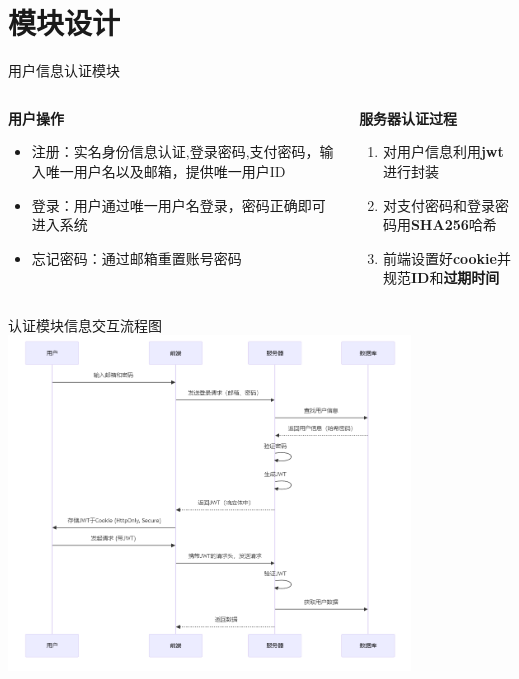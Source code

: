 \documentclass[]{beamer}
\begin{document}
    \section{模块设计}
    \begin{frame}{用户信息认证模块}
        \begin{columns}
            \begin{column}{0.5\textwidth}
                \textbf{用户操作}
                \begin{itemize}
                    \item 注册：实名身份信息认证,登录密码,支付密码，输入唯一用户名以及邮箱，提供唯一用户ID
                    \item 登录：用户通过唯一用户名登录，密码正确即可进入系统
                    \item 忘记密码：通过邮箱重置账号密码
                \end{itemize}
            \end{column}
            \begin{column}{0.5\textwidth}
                \textbf{服务器认证过程}
                \begin{enumerate}
                    \item 对用户信息利用\textbf{jwt}进行封装
                    \item 对支付密码和登录密码用\textbf{SHA256}哈希
                    \item 前端设置好\textbf{cookie}并规范\textbf{ID}和\textbf{过期时间}
                \end{enumerate}
            \end{column}
        \end{columns}
    \end{frame}

    \begin{frame}{认证模块信息交互流程图}   
        \includegraphics[width = 0.8\textwidth]{newsqe.png}
    \end{frame}
\end{document}
